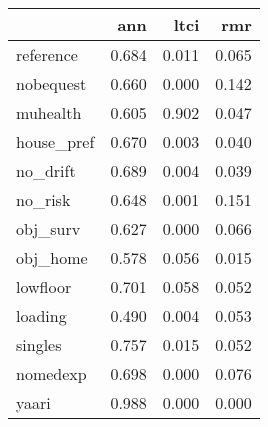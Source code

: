 \begin{tabular}{lrrr}
\toprule
{} &    ann &   ltci &    rmr \\
\midrule
reference  &  0.684 &  0.011 &  0.065 \\
nobequest  &  0.660 &  0.000 &  0.142 \\
muhealth   &  0.605 &  0.902 &  0.047 \\
house\_pref &  0.670 &  0.003 &  0.040 \\
no\_drift   &  0.689 &  0.004 &  0.039 \\
no\_risk    &  0.648 &  0.001 &  0.151 \\
obj\_surv   &  0.627 &  0.000 &  0.066 \\
obj\_home   &  0.578 &  0.056 &  0.015 \\
lowfloor   &  0.701 &  0.058 &  0.052 \\
loading    &  0.490 &  0.004 &  0.053 \\
singles    &  0.757 &  0.015 &  0.052 \\
nomedexp   &  0.698 &  0.000 &  0.076 \\
yaari      &  0.988 &  0.000 &  0.000 \\
\bottomrule
\end{tabular}
